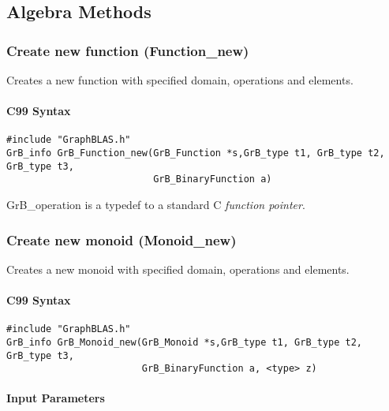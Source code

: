 \subsection{Algebra Methods}


\subsubsection{Create new function ({\sf Function\_new})}

Creates a new function with specified domain, operations and elements.

\paragraph{C99 Syntax}

\begin{verbatim}
#include "GraphBLAS.h"
GrB_info GrB_Function_new(GrB_Function *s,GrB_type t1, GrB_type t2, GrB_type t3,
                          GrB_BinaryFunction a)
\end{verbatim}

GrB\_operation is a typedef to a standard C \emph{function pointer}.


\subsubsection{Create new monoid ({\sf Monoid\_new})}

Creates a new monoid with specified domain, operations and elements.

\paragraph{C99 Syntax}

\begin{verbatim}
#include "GraphBLAS.h"
GrB_info GrB_Monoid_new(GrB_Monoid *s,GrB_type t1, GrB_type t2, GrB_type t3,
                        GrB_BinaryFunction a, <type> z)
\end{verbatim}

\paragraph{Input Parameters}

